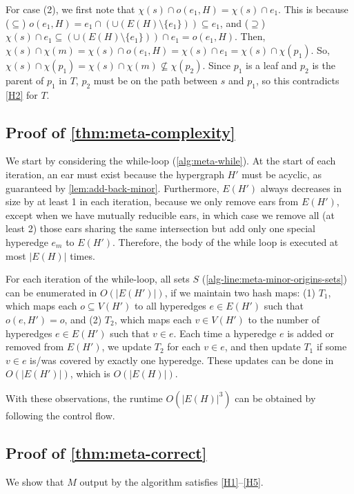     For case (2), we first note that $\chi(s) \cap o(e_1, H) = \chi(s) \cap e_1$. This is because ($\subseteq$) $o(e_1, H) = e_1 \cap (\cup (E(H) \setminus \{ e_1 \})) \subseteq e_1$, and ($\supseteq$) $\chi(s) \cap e_1 \subseteq (\cup (E(H) \setminus \{e_1 \})) \cap e_1 = o(e_1, H)$. Then, $\chi(s) \cap \chi(m) = \chi(s) \cap o(e_1, H) = \chi(s) \cap e_1 = \chi(s) \cap \chi(p_1)$. So, $\chi(s) \cap \chi(p_1) = \chi(s) \cap \chi(m) \not\subseteq \chi(p_2)$. Since $p_1$ is a leaf and $p_2$ is the parent of $p_1$ in $T$, $p_2$ must be on the path between $s$ and $p_1$, so this contradicts \ref{H2} for $T$.

\subsection{Proof of \cref{thm:meta-complexity}}

    We start by considering the while-loop (\cref{alg:meta-while}). At the start of each iteration, an ear must exist because the hypergraph $H'$ must be acyclic, as guaranteed by \cref{lem:add-back-minor}. Furthermore, $E(H')$ always decreases in size by at least 1 in each iteration, because we only remove ears from $E(H')$, except when we have mutually reducible ears, in which case we remove all (at least 2) those ears sharing the same intersection but add only one special hyperedge $e_m$ to $E(H')$.
    Therefore, the body of the while loop is executed at most $|E(H)|$ times.
    
    For each iteration of the while-loop, all sets $S$ (\cref{alg-line:meta-minor-origins-sets}) can be enumerated in $O(|E(H')|)$, if we maintain two hash maps: (1) $T_1$, which maps each $o \subseteq V(H')$ to all hyperedges $e \in E(H')$ such that $o(e, H') = o$, and (2) $T_2$, which maps each $v \in V(H')$ to the number of hyperedges $e \in E(H')$ such that $v \in e$.
    Each time a hyperedge $e$ is added or removed from $E(H')$, we update $T_2$ for each $v \in e$, and then update $T_1$ if some $v \in e$ is/was covered by exactly one hyperedge. These updates can be done in $O(|E(H')|)$, which is $O(|E(H)|)$.
    
    With these observations, the runtime $O(|E(H)|^3)$ can be obtained by following the control flow.

\subsection{Proof of \cref{thm:meta-correct}}
We show that $M$ output by the algorithm satisfies \ref{H1}--\ref{H5}.

